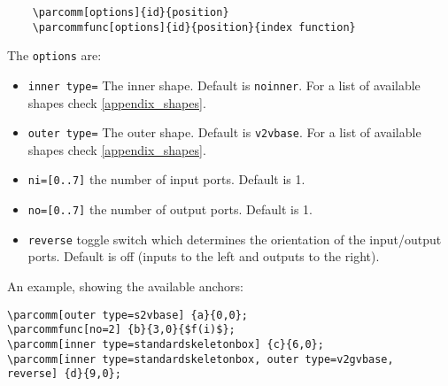 \documentclass[10pt]{article}
\begin{document}
\begin{verbatim}
	\parcomm[options]{id}{position}
	\parcommfunc[options]{id}{position}{index function}
\end{verbatim}

The \texttt{options} are:
\begin{itemize}
\item \texttt{inner type=} The inner shape. Default is \texttt{noinner}. For a list of available shapes check \autoref{appendix_shapes}.
\item \texttt{outer type=} The outer shape. Default is \texttt{v2vbase}. For a list of available shapes check \autoref{appendix_shapes}.
\item \texttt{ni=[0..7]} the number of input ports. Default is 1.
\item \texttt{no=[0..7]} the number of output ports. Default is 1.
\item\texttt{reverse} toggle switch which determines the orientation of the input/output ports. Default is off (inputs to the left and outputs to the right).
\end{itemize}

An example, showing the available anchors:
\begin{verbatim}
\parcomm[outer type=s2vbase] {a}{0,0};
\parcommfunc[no=2] {b}{3,0}{$f(i)$};
\parcomm[inner type=standardskeletonbox] {c}{6,0};
\parcomm[inner type=standardskeletonbox, outer type=v2gvbase, 
reverse] {d}{9,0};
\end{verbatim}

%
\end{document}
